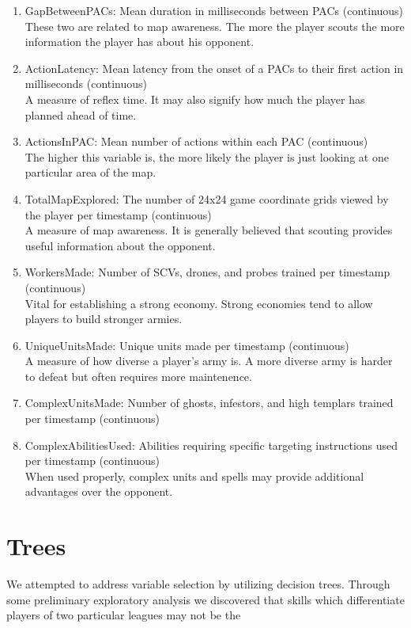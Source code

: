 \documentclass[letterpaper,10pt,english]{/usr/share/sphinx/texinputs/sphinxhowto}
\begin{document}
\begin{enumerate}[1.]
\item
  GapBetweenPACs: Mean duration in milliseconds between PACs
  (continuous)\\These two are related to map awareness. The more the
  player scouts the more information the player has about his opponent.
\item
  ActionLatency: Mean latency from the onset of a PACs to their first
  action in milliseconds (continuous)\\A measure of reflex time. It may
  also signify how much the player has planned ahead of time.
\item
  ActionsInPAC: Mean number of actions within each PAC (continuous)\\The
  higher this variable is, the more likely the player is just looking at
  one particular area of the map.
\item
  TotalMapExplored: The number of 24x24 game coordinate grids viewed by
  the player per timestamp (continuous)\\A measure of map awareness. It
  is generally believed that scouting provides useful information about
  the opponent.
\item
  WorkersMade: Number of SCVs, drones, and probes trained per timestamp
  (continuous)\\Vital for establishing a strong economy. Strong
  economies tend to allow players to build stronger armies.
\item
  UniqueUnitsMade: Unique units made per timestamp (continuous)\\A
  measure of how diverse a player's army is. A more diverse army is
  harder to defeat but often requires more maintenence.
\item
  ComplexUnitsMade: Number of ghosts, infestors, and high templars
  trained per timestamp (continuous)\\
\item
  ComplexAbilitiesUsed: Abilities requiring specific targeting
  instructions used per timestamp (continuous)\\When used properly,
  complex units and spells may provide additional advantages over the
  opponent.
\end{enumerate}\part{Trees}We attempted to address variable selection by utilizing decision trees.
Through some preliminary exploratory analysis we discovered that skills
which differentiate players of two particular leagues may not be the
\end{document}
